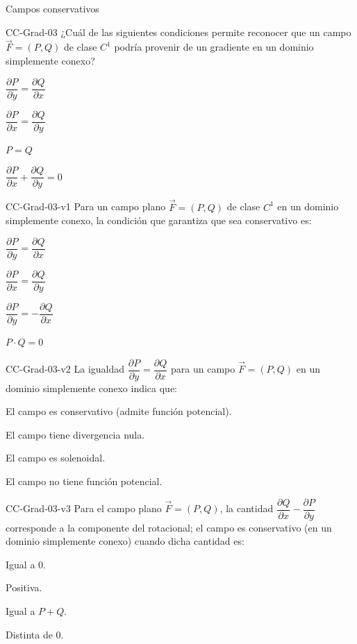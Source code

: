 \documentclass[a4,11pt]{aleph-notas}
\begin{document}
\begin{quiz}{Campos conservativos}
\begin{multi}[]%
    {CC-Grad-03}
    ¿Cuál de las siguientes condiciones permite reconocer que un campo $\vec{F}=(P,Q)$ de clase $C^1$ podría provenir de un gradiente en un dominio simplemente conexo?
    \item* $\dfrac{\partial P}{\partial y} = \dfrac{\partial Q}{\partial x}$
    \item $\dfrac{\partial P}{\partial x} = \dfrac{\partial Q}{\partial y}$
    \item $P = Q$
    \item $\dfrac{\partial P}{\partial x} + \dfrac{\partial Q}{\partial y} = 0$
\end{multi}

\begin{multi}[]%
    {CC-Grad-03-v1}
    Para un campo plano $\vec{F}=(P,Q)$ de clase $C^1$ en un dominio simplemente conexo, la condición que garantiza que sea conservativo es:
    \item* $\dfrac{\partial P}{\partial y} = \dfrac{\partial Q}{\partial x}$
    \item $\dfrac{\partial P}{\partial x} = \dfrac{\partial Q}{\partial y}$
    \item $\dfrac{\partial P}{\partial y} = -\dfrac{\partial Q}{\partial x}$
    \item $P\cdot Q = 0$
\end{multi}

\begin{multi}[]%
    {CC-Grad-03-v2}
    La igualdad $\dfrac{\partial P}{\partial y} = \dfrac{\partial Q}{\partial x}$ para un campo $\vec{F}=(P,Q)$ en un dominio simplemente conexo indica que:
    \item* El campo es conservativo (admite función potencial).
    \item El campo tiene divergencia nula.
    \item El campo es solenoidal.
    \item El campo no tiene función potencial.
\end{multi}

\begin{multi}[]%
    {CC-Grad-03-v3}
    Para el campo plano $\vec{F}=(P,Q)$, la cantidad $\dfrac{\partial Q}{\partial x}-\dfrac{\partial P}{\partial y}$ corresponde a la componente del rotacional; el campo es conservativo (en un dominio simplemente conexo) cuando dicha cantidad es:
    \item* Igual a $0$.
    \item Positiva.
    \item Igual a $P+Q$.
    \item Distinta de $0$.
\end{multi}

\end{quiz}
\end{document}
